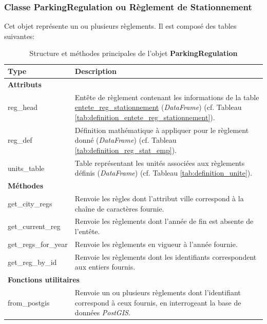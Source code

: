         \subsubsection{Classe ParkingRegulation ou Règlement de Stationnement} 
            Cet objet représente un ou plusieurs règlements. Il est composé des tables suivantes:
            {\captionsetup{justification=centering}
            \setlength{\LTcapwidth}{\linewidth} 
            \begin{table}[H]
            \centering
            \caption{Structure et méthodes principales de l'objet \textbf{ParkingRegulation}}
            \label{tab:parkingregulation_structure}
            \begin{tabular}{p{5cm}p{11cm}}
            \toprule
            \textbf{Type} & \textbf{Description} \\
            \midrule
            \multicolumn{2}{l}{\textbf{Attributs}} \\
            \midrule
            reg\_head & Entête de règlement contenant les informations de la table \underline{entete\_reg\_stationnement} (\textit{DataFrame}) (cf. Tableau \ref{tab:definition_entete_reg_stationnement}). \\
            reg\_def & Définition mathématique à appliquer pour le règlement donné (\textit{DataFrame}) (cf. Tableau \ref{tab:definition_reg_stat_emp}). \\
            units\_table & Table représentant les unités associées aux règlements définis (\textit{DataFrame}) (cf. Tableau \ref{tab:definition_unite}). \\
            \midrule
            \multicolumn{2}{l}{\textbf{Méthodes}} \\
            \midrule
            get\_city\_regs & Renvoie les règles dont l'attribut ville correspond à la chaîne de caractères fournie. \\
            get\_current\_reg & Renvoie les règlements dont l'année de fin est absente de l'entête. \\
            get\_regs\_for\_year & Renvoie les règlements en vigueur à l'année fournie. \\
            get\_reg\_by\_id & Renvoie les règlements dont les identifiants correspondent aux entiers fournis. \\
            \midrule
            \multicolumn{2}{l}{\textbf{Fonctions utilitaires}} \\
            \midrule
            from\_postgis & Renvoie un ou plusieurs règlements dont l'identifiant correspond à ceux fournis, en interrogeant la base de données \textit{PostGIS}. \\
            \bottomrule
            \end{tabular}
            \end{table}}
        
